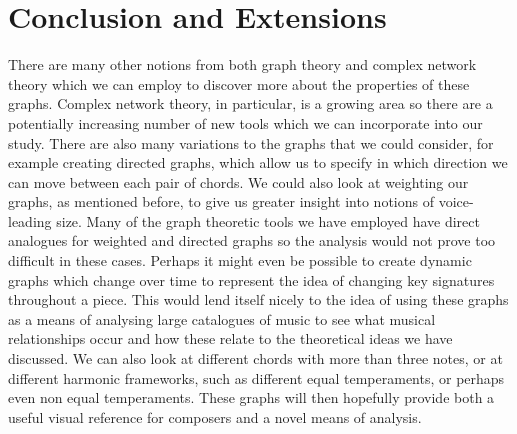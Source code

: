 \documentclass[]{tMAM2e}
\begin{document}
\section{Conclusion and Extensions}

There are many other notions from both graph theory and complex network theory which we can employ to discover more about the properties of these graphs. Complex network theory, in particular, is a growing area so there are a potentially increasing number of new tools which we can incorporate into our study. There are also many variations to the graphs that we could consider, for example creating directed graphs, which allow us to specify in which direction we can move between each pair of chords. We could also look at weighting our graphs, as mentioned before, to give us greater insight into notions of voice-leading size. Many of the graph theoretic tools we have employed have direct analogues for weighted and directed graphs so the analysis would not prove too difficult in these cases. Perhaps it might even be possible to create dynamic graphs which change over time to represent the idea of changing key signatures throughout a piece. This would lend itself nicely to the idea of using these graphs as a means of analysing large catalogues of music to see what musical relationships occur and how these relate to the theoretical ideas we have discussed. We can also look at different chords with more than three notes, or at different harmonic frameworks, such as different equal temperaments, or perhaps even non equal temperaments. These graphs will then hopefully provide both a useful visual reference for composers and a novel means of analysis.



\end{document}
